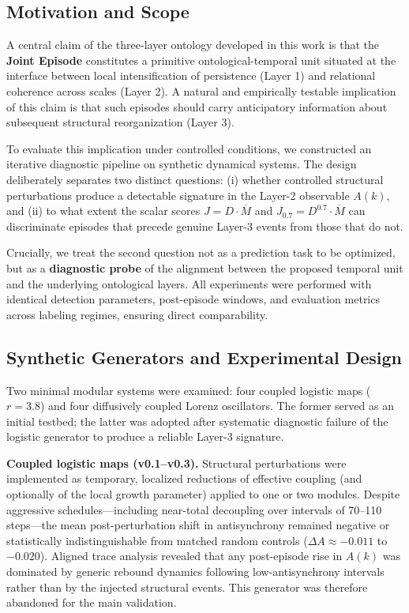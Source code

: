 \subsection{Motivation and Scope}

A central claim of the three-layer ontology developed in this work is that the \textbf{Joint Episode} constitutes a primitive ontological-temporal unit situated at the interface between local intensification of persistence (Layer 1) and relational coherence across scales (Layer 2). A natural and empirically testable implication of this claim is that such episodes should carry anticipatory information about subsequent structural reorganization (Layer 3).

To evaluate this implication under controlled conditions, we constructed an iterative diagnostic pipeline on synthetic dynamical systems. The design deliberately separates two distinct questions: (i) whether controlled structural perturbations produce a detectable signature in the Layer-2 observable \(A(k)\), and (ii) to what extent the scalar scores \(J = D \cdot \overline{M}\) and \(J_{0.7} = D^{0.7} \cdot \overline{M}\) can discriminate episodes that precede genuine Layer-3 events from those that do not.

Crucially, we treat the second question not as a prediction task to be optimized, but as a \textbf{diagnostic probe} of the alignment between the proposed temporal unit and the underlying ontological layers. All experiments were performed with identical detection parameters, post-episode windows, and evaluation metrics across labeling regimes, ensuring direct comparability.

\subsection{Synthetic Generators and Experimental Design}

Two minimal modular systems were examined: four coupled logistic maps (\(r = 3.8\)) and four diffusively coupled Lorenz oscillators. The former served as an initial testbed; the latter was adopted after systematic diagnostic failure of the logistic generator to produce a reliable Layer-3 signature.

\textbf{Coupled logistic maps (v0.1--v0.3).} Structural perturbations were implemented as temporary, localized reductions of effective coupling (and optionally of the local growth parameter) applied to one or two modules. Despite aggressive schedules---including near-total decoupling over intervals of 70--110 steps---the mean post-perturbation shift in antisynchrony remained negative or statistically indistinguishable from matched random controls (\(\Delta A \approx -0.011\) to \(-0.020\)). Aligned trace analysis revealed that any post-episode rise in \(A(k)\) was dominated by generic rebound dynamics following low-antisynchrony intervals rather than by the injected structural events. This generator was therefore abandoned for the main validation.


